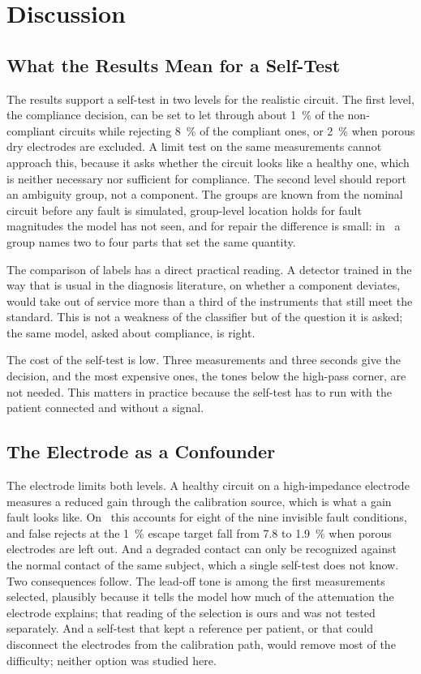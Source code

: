 \section{Discussion}
\label{sec:discussion}

\subsection{What the Results Mean for a Self-Test}

The results support a self-test in two levels for the realistic circuit. The first level, the
compliance decision, can be set to let through about \SI{1}{\percent} of the non-compliant
circuits while rejecting \SI{8}{\percent} of the compliant ones, or \SI{2}{\percent} when porous
dry electrodes are excluded. A limit test on the same measurements cannot approach this, because
it asks whether the circuit looks like a healthy one, which is neither necessary nor sufficient
for compliance. The second level should report an ambiguity group, not a component. The groups
are known from the nominal circuit before any fault is simulated, group-level location holds for
fault magnitudes the model has not seen, and for repair the difference is small: in \cA\ a group
names two to four parts that set the same quantity.

The comparison of labels has a direct practical reading. A detector trained in the way that is
usual in the diagnosis literature, on whether a component deviates, would take out of service
more than a third of the instruments that still meet the standard. This is not a weakness of the
classifier but of the question it is asked; the same model, asked about compliance, is right.

The cost of the self-test is low. Three measurements and three seconds give the decision, and the
most expensive ones, the tones below the high-pass corner, are not needed. This matters in
practice because the self-test has to run with the patient connected and without a signal.

\subsection{The Electrode as a Confounder}

The electrode limits both levels. A healthy circuit on a high-impedance electrode measures a
reduced gain through the calibration source, which is what a gain fault looks like. On \cA\ this
accounts for eight of the nine invisible fault conditions, and false rejects at the
\SI{1}{\percent} escape target fall from 7.8 to \SI{1.9}{\percent} when porous electrodes are
left out. And a
degraded contact can only be recognized against the normal contact of the same subject, which a
single self-test does not know. Two consequences follow. The lead-off tone is among the first
measurements selected, plausibly because it tells the model how much of the attenuation the
electrode explains; that reading of the selection is ours and was not tested separately. And a self-test that kept a reference per patient, or that could disconnect the
electrodes from the calibration path, would remove most of the difficulty; neither option was
studied here.

